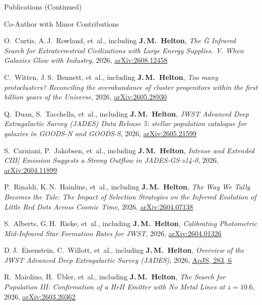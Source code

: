 \documentclass{JMH_CV}
\begin{document}
\begin{rSection}{Publications (Continued)}
\begin{rSubsection}{Co-Author with Minor Contributions}{}{}{}
\begin{etaremune}
    \item O.~Curtis, A.\,J.~Rowland, et~al., including \textbf{J.\,M.~Helton}, \textit{The Ĝ Infrared Search for Extraterrestrial Civilizations with Large Energy Supplies. V. When Galaxies Glow with Industry}, 2026, \href{https://www.scixplorer.org/abs/2026arXiv260812458C/abstract}{\ul{arXiv:2608.12458}}

    \item C.~Witten, J.\,S.~Bennett, et~al., including \textbf{J.\,M.~Helton}, \textit{Too many protoclusters? Reconciling the overabundance of cluster progenitors within the first billion years of the Universe}, 2026, \href{https://www.scixplorer.org/abs/2026arXiv260528930W/abstract}{\ul{arXiv:2605.28930}}

    \item Q.~Duan, S.~Tacchella, et~al., including \textbf{J.\,M.~Helton}, \textit{JWST Advanced Deep Extragalactic Survey (JADES) Data Release 5: stellar population catalogue for galaxies in GOODS-N and GOODS-S}, 2026, \href{https://www.scixplorer.org/abs/2026arXiv260521599D/abstract}{\ul{arXiv:2605.21599}}

    \item S.~Carniani, P.~Jakobsen, et~al., including \textbf{J.\,M.~Helton}, \textit{Intense and Extended CIII] Emission Suggests a Strong Outflow in JADES-GS-z14-0}, 2026, \href{https://www.scixplorer.org/abs/2026arXiv260411899C/abstract}{\ul{arXiv:2604.11899}}

    \item P.~Rinaldi, K.\,N.~Hainline, et~al., including \textbf{J.\,M.~Helton}, \textit{The Way We Tally Becomes the Tale: The Impact of Selection Strategies on the Inferred Evolution of Little Red Dots Across Cosmic Time}, 2026, \href{https://www.scixplorer.org/abs/2026arXiv260407138R/abstract}{\ul{arXiv:2604.07138}}

    \item S.~Alberts, G.\,H.~Rieke, et~al., including \textbf{J.\,M.~Helton}, \textit{Calibrating Photometric Mid-Infrared Star Formation Rates for JWST}, 2026, \href{https://www.scixplorer.org/abs/2026arXiv260401326A/abstract}{\ul{arXiv:2604.01326}}

    \item D.\,J.~Eisenstein, C.~Willott, et~al., including \textbf{J.\,M.~Helton}, \textit{Overview of the JWST Advanced Deep Extragalactic Survey (JADES)}, 2026, \href{https://www.scixplorer.org/abs/2026ApJS..283....6E/abstract}{\ul{ApJS, 283, 6}}

    \item R.~Maiolino, H.~\"{U}bler, et~al., including \textbf{J.\,M.~Helton}, \textit{The Search for Population III: Confirmation of a HeII Emitter with No Metal Lines at $\mathit{z = 10.6}$}, 2026, \href{https://www.scixplorer.org/abs/2026arXiv260320362M/abstract}{\ul{arXiv:2603.20362}}


\end{etaremune}
\end{rSubsection}
\end{rSection}
\end{document}
